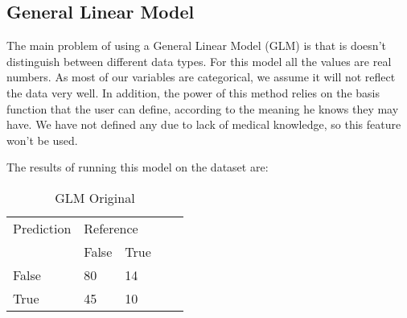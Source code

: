 



\subsection{General Linear Model}

The main problem of using a General Linear Model (GLM) is that is doesn't distinguish between different data types. For this model all the values are real numbers. As most of our variables are categorical, we assume it will not reflect the data very well. In addition, the power of this method relies on the basis function that the user can define, according to the meaning he knows they may have. We have not defined any due to lack of medical knowledge, so this feature won't be used.


The results of running this model on the dataset are:

\begin{table}[!htbp]
\centering
\caption{GLM Original}
\vspace{0.1cm}
\label{glm-orig}
\begin{tabular}{|l|ll|ll}
\cline{1-3}
Prediction & \multicolumn{2}{l|}{Reference} &  &  \\
           & False          & True          &  &  \\ \cline{2-3}
False      & 80              & 14             &  &  \\
True       & 45              & 10             &  &  \\ \cline{1-3}
\end{tabular}
\end{table}

